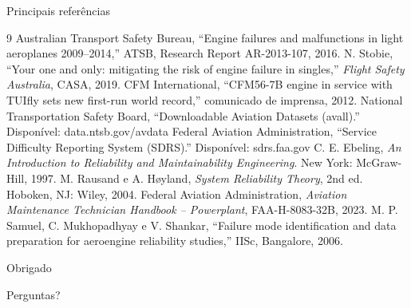 \documentclass[aspectratio=169,11pt]{beamer}
\begin{document}
\begin{frame}{Principais referências}
  \scriptsize
  \begin{thebibliography}{9}
     Australian Transport Safety Bureau, ``Engine failures and malfunctions in light aeroplanes 2009--2014,'' ATSB, Research Report AR-2013-107, 2016.
     N. Stobie, ``Your one and only: mitigating the risk of engine failure in singles,'' \emph{Flight Safety Australia}, CASA, 2019.
     CFM International, ``CFM56-7B engine in service with TUIfly sets new first-run world record,'' comunicado de imprensa, 2012.
     National Transportation Safety Board, ``Downloadable Aviation Datasets (avall).'' Disponível: data.ntsb.gov/avdata
     Federal Aviation Administration, ``Service Difficulty Reporting System (SDRS).'' Disponível: sdrs.faa.gov
     C. E. Ebeling, \emph{An Introduction to Reliability and Maintainability Engineering}. New York: McGraw-Hill, 1997.
     M. Rausand e A. Høyland, \emph{System Reliability Theory}, 2nd ed. Hoboken, NJ: Wiley, 2004.
     Federal Aviation Administration, \emph{Aviation Maintenance Technician Handbook -- Powerplant}, FAA-H-8083-32B, 2023.
     M. P. Samuel, C. Mukhopadhyay e V. Shankar, ``Failure mode identification and data preparation for aeroengine reliability studies,'' IISc, Bangalore, 2006.
  \end{thebibliography}
\end{frame}

\begin{frame}{Obrigado}
  \centering
  \vfill
  {\Large Perguntas?\par}
  \vfill
\end{frame}
\end{document}
